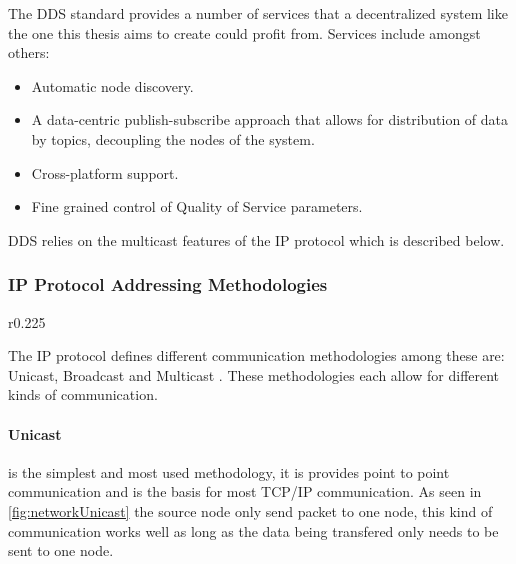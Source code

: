 The DDS standard provides a number of services that a decentralized system like the one this thesis aims to create could profit from.
Services include amongst others:

\begin{itemize}
	\item Automatic node discovery.
	\item A data-centric publish-subscribe approach that allows for distribution of data by topics, decoupling the nodes of the system.
	\item Cross-platform support.
	\item Fine grained control of Quality of Service parameters.
\end{itemize}

DDS relies on the multicast features of the IP protocol which is described below.

\subsubsection{IP Protocol Addressing Methodologies}

\begin{wrapfigure}{r}{0.225\textwidth}
	\vspace{-20pt}
	
	\vspace{-10pt}
\end{wrapfigure}

The IP protocol defines different communication methodologies among these are: Unicast, Broadcast \cite{RFC0919_Broadcast} and Multicast \cite{RFC1112_Multicast_IGMPv1}.
These methodologies each allow for different kinds of communication.

\paragraph{Unicast} is the simplest and most used methodology, it is provides point to point communication and is the basis for most TCP/IP communication.
As seen in \cref{fig:networkUnicast} the source node only send packet to one node, this kind of communication works well as long as the data being transfered only needs to be sent to one node.

